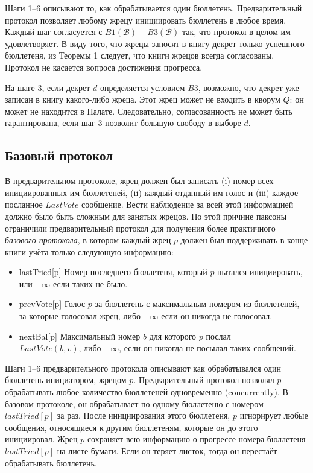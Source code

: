 \documentclass[12pt, a4paper]{article} %
\begin{document}
Шаги 1--6 описывают то, как обрабатывается один бюллетень. Предварительный протокол позволяет любому жрецу инициировать бюллетень в любое время. Каждый шаг согласуется с $B1(\mathcal{B}) - B3(\mathcal{B})$ так, что протокол в целом им удовлетворяет. В виду того, что жрецы заносят в книгу декрет только успешного бюллетеня, из Теоремы 1 следует, что книги жрецов всегда согласованы. Протокол не касается вопроса достижения прогресса.

На шаге 3, если декрет $d$ определяется условием $B3$, возможно, что декрет уже записан в книгу какого-либо жреца. Этот жрец может не входить в кворум $Q$: он может не находится в Палате. Следовательно, согласованность не может быть гарантирована, если шаг 3 позволит большую свободу в выборе $d$.

\subsection{Базовый протокол}

В предварительном протоколе, жрец должен был записать (i) номер всех инициированных им бюллетеней, (ii) каждый отданный им голос и (iii) каждое посланное $LastVote$ сообщение. Вести наблюдение за всей этой информацией должно было быть сложным для занятых жрецов. По этой причине паксоны ограничили предварительный протокол для получения более практичного \textit{базового протокола}, в котором каждый жрец $p$ должен был поддерживать в конце книги учёта только следующую информацию:
\begin{itemize}
    \item[]lastTried[p] Номер последнего бюллетеня, который $p$ пытался инициировать, или $-\infty$ если таких не было.
    \item[]prevVote[p] Голос $p$ за бюллетень с максимальным номером из бюллетеней, за которые голосовал жрец, либо $-\infty$ если он никогда не голосовал.
    \item[]nextBal[p] Максимальный номер $b$ для которого $p$ послал \\
    $LastVote(b, v)$, либо $-\infty$, если он никогда не посылал таких сообщений.
\end{itemize}

Шаги 1--6 предварительного протокола описывают как обрабатывался один бюллетень инициатором, жрецом $p$. Предварительный протокол позволял $p$ обрабатывать любое количество бюллетеней одновременно (concurrently). В базовом протоколе, он обрабатывает по одному бюллетеню с номером $lastTried[p]$ за раз. После инициирования этого бюллетеня, $p$ игнорирует любые сообщения, относящиеся к другим бюллетеням, которые он до этого инициировал. Жрец $p$ сохраняет всю информацию о прогрессе номера бюллетеня $lastTried[p]$ на листе бумаги. Если он теряет листок, тогда он перестаёт обрабатывать бюллетень.
\end{document}
